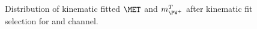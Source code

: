 \begin{figure}
    \caption{Distribution of kinematic fitted $\MET$ and $m_{\PW^+}^{T}$ after kinematic fit selection 
	for \mujets and \ejets channel.}
    \label{fig:kfitPlot3}
\end{figure}
